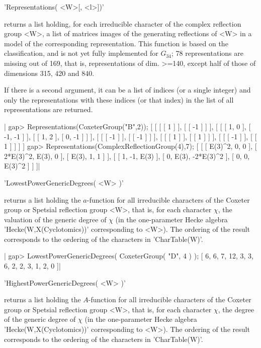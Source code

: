 'Representations( <W>[, <l>])'

returns  a  list  holding,  for  each  irreducible character of the complex
reflection  group  <W>,  a  list  of  matrices  images  of  the  generating
reflections  of <W>  in a  model of  the corresponding representation. This
function  is based on the classification,  and is not yet fully implemented
for  $G_{34}$;  78  representations  are  missing  out  of  169,  that  is,
representations  of dim. >=140, except half of those of dimensions 315, 420
and 840.

If  there is a  second argument, it  can be a  list of indices (or a single
integer) and only the representations with these indices (or that index) in
the list of all representations are returned.

|    gap> Representations(CoxeterGroup("B",2));
    [ [ [ [ 1 ] ], [ [ -1 ] ] ],
      [ [ [ 1, 0 ], [ -1, -1 ] ], [ [ 1, 2 ], [ 0, -1 ] ] ],
      [ [ [ -1 ] ], [ [ -1 ] ] ], [ [ [ 1 ] ], [ [ 1 ] ] ],
      [ [ [ -1 ] ], [ [ 1 ] ] ] ]
    gap> Representations(ComplexReflectionGroup(4),7);
    [ [ [ E(3)^2, 0, 0 ], [ 2*E(3)^2, E(3), 0 ], [ E(3), 1, 1 ] ],
      [ [ 1, -1, E(3) ], [ 0, E(3), -2*E(3)^2 ], [ 0, 0, E(3)^2 ] ] ]|


'LowestPowerGenericDegrees( <W> )'

returns  a list holding the $a$-function  for all irreducible characters of
the  Coxeter  group  or  Spetsial  reflection  group <W>, that is, for each
character  $\chi$, the  valuation of  the generic  degree of $\chi$ (in the
one-parameter  Hecke  algebra  'Hecke(W,X(Cyclotomics))'  corresponding  to
<W>).  The  ordering  of  the  result  corresponds  to  the ordering of the
characters in 'CharTable(W)'.

|    gap> LowestPowerGenericDegrees( CoxeterGroup( "D", 4 ) );
    [ 6, 6, 7, 12, 3, 3, 6, 2, 2, 3, 1, 2, 0 ]|


'HighestPowerGenericDegrees( <W> )'

returns  a list holding the $A$-function  for all irreducible characters of
the  Coxeter  group  or  Spetsial  reflection  group <W>, that is, for each
character  $\chi$,  the  degree  of  the  generic  degree of $\chi$ (in the
one-parameter  Hecke  algebra  'Hecke(W,X(Cyclotomics))'  corresponding  to
<W>).  The  ordering  of  the  result  corresponds  to  the ordering of the
characters in 'CharTable(W)'.


